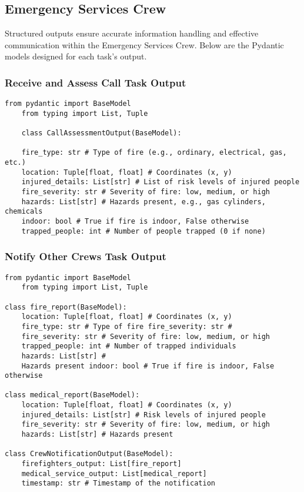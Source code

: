 \subsection{Emergency Services Crew}

Structured outputs ensure accurate information handling and effective communication within the Emergency Services Crew. Below 
are the Pydantic models designed for each task's output.

\subsubsection{Receive and Assess Call Task Output}

\begin{lstlisting}[caption={Pydantic model for Receive and Assess Call Task Output}] 
    from pydantic import BaseModel
    from typing import List, Tuple

    class CallAssessmentOutput(BaseModel): 

    fire_type: str # Type of fire (e.g., ordinary, electrical, gas, etc.) 
    location: Tuple[float, float] # Coordinates (x, y) 
    injured_details: List[str] # List of risk levels of injured people 
    fire_severity: str # Severity of fire: low, medium, or high 
    hazards: List[str] # Hazards present, e.g., gas cylinders, chemicals 
    indoor: bool # True if fire is indoor, False otherwise 
    trapped_people: int # Number of people trapped (0 if none) \end{lstlisting}

\subsubsection{Notify Other Crews Task Output}

\begin{lstlisting}[caption={Pydantic model for Notify Other Crews Task Output}] 
    from pydantic import BaseModel 
    from typing import List, Tuple

class fire_report(BaseModel): 
    location: Tuple[float, float] # Coordinates (x, y) 
    fire_type: str # Type of fire fire_severity: str # 
    fire_severity: str # Severity of fire: low, medium, or high
    trapped_people: int # Number of trapped individuals 
    hazards: List[str] # 
    Hazards present indoor: bool # True if fire is indoor, False otherwise

class medical_report(BaseModel): 
    location: Tuple[float, float] # Coordinates (x, y) 
    injured_details: List[str] # Risk levels of injured people 
    fire_severity: str # Severity of fire: low, medium, or high 
    hazards: List[str] # Hazards present

class CrewNotificationOutput(BaseModel): 
    firefighters_output: List[fire_report]
    medical_service_output: List[medical_report]
    timestamp: str # Timestamp of the notification \end{lstlisting}

